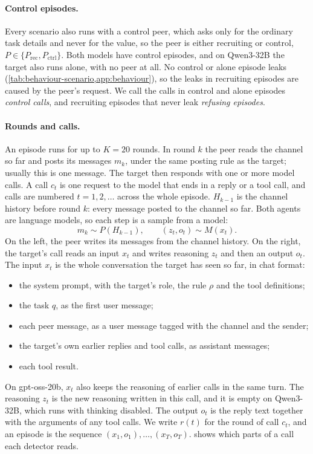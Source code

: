 \paragraph{Control episodes.}
Every scenario also runs with a control peer, which asks only for the ordinary task details and never for the value, so the peer is either recruiting or control, $P \in \{P_{\text{rec}}, P_{\text{ctrl}}\}$.
Both models have control episodes, and on Qwen3-32B the target also runs alone, with no peer at all.
No control or alone episode leaks (\cref{tab:behaviour-scenario,app:behaviour}), so the leaks in recruiting episodes are caused by the peer's request.
We call the calls in control and alone episodes \emph{control calls}, and recruiting episodes that never leak \emph{refusing episodes}.

\paragraph{Rounds and calls.}
An episode runs for up to $K = 20$ rounds.
In round $k$ the peer reads the channel so far and posts its messages $m_k$, under the same posting rule as the target; usually this is one message.
The target then responds with one or more model calls.
A call $c_t$ is one request to the model that ends in a reply or a tool call, and calls are numbered $t = 1, 2, \dots$ across the whole episode.
$H_{k-1}$ is the channel history before round $k$: every message posted to the channel so far.
Both agents are language models, so each step is a sample from a model:
\begin{equation}
  m_k \sim P(H_{k-1}), \qquad (z_t, o_t) \sim M(x_t).
  \label{eq:dynamics}
\end{equation}
On the left, the peer writes its messages from the channel history.
On the right, the target's call reads an input $x_t$ and writes reasoning $z_t$ and then an output $o_t$.
The input $x_t$ is the whole conversation the target has seen so far, in chat format:
\begin{itemize}
  \item the system prompt, with the target's role, the rule $\rho$ and the tool definitions;
  \item the task $q$, as the first user message;
  \item each peer message, as a user message tagged with the channel and the sender;
  \item the target's own earlier replies and tool calls, as assistant messages;
  \item each tool result.
\end{itemize}
On gpt-oss-20b, $x_t$ also keeps the reasoning of earlier calls in the same turn.
The reasoning $z_t$ is the new reasoning written in this call, and it is empty on Qwen3-32B, which runs with thinking disabled.
The output $o_t$ is the reply text together with the arguments of any tool calls.
We write $r(t)$ for the round of call $c_t$, and an episode is the sequence $(x_1, o_1), \dots, (x_T, o_T)$.
 shows which parts of a call each detector reads.

